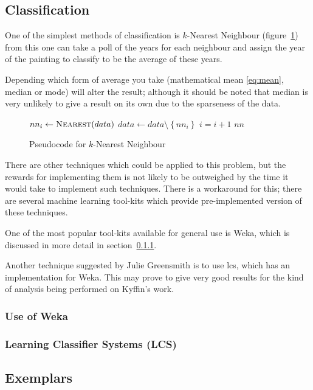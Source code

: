 \subsection{Classification}
One of the simplest methods of classification is $k$-Nearest Neighbour (figure~\ref{fig:knn}) from
this one can take a poll of the years for each neighbour and assign the year of the painting to
classify to be the average of these years.

Depending which form of average you take (mathematical mean \eqref{eq:mean}, median or mode) will
alter the result; although it should be noted that median is very unlikely to give a result on its
own due to the sparseness of the data.

\begin{figure}[h]
\begin{algorithmic}
 
    \State $nn_i \gets \Call{Nearest}{data}$
    \State $data \gets data \setminus \left\{{nn_i}\right\}$
    \State $i = i + 1$
  \EndFor
  \Statex
  \Return $nn$
\EndFunction
\end{algorithmic}
\caption{Pseudocode for $k$-Nearest Neighbour}\label{fig:knn}
\end{figure}

There are other techniques which could be applied to this problem, but the rewards for 
implementing them is not likely to be outweighed by the time it would take to implement such
techniques. There is a workaround for this; there are several machine learning tool-kits which 
provide pre-implemented version of these techniques.

One of the most popular tool-kits available for general use is Weka\cite{Hall2009WEKA}, which is discussed in more
detail in section~\ref{sec:bg-weka}.

Another technique suggested by Julie Greensmith is to use \gls{lcs}\cite{Bacardit2013Largescale}, 
which has an implementation for Weka. This may prove to give very good results for the kind of
analysis being performed on Kyffin's work.

\subsubsection{Use of Weka}\label{sec:bg-weka}

\subsubsection{Learning Classifier Systems (LCS)}

\subsection{Exemplars}



